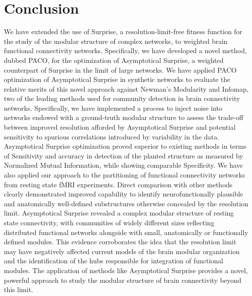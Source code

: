 \section{Conclusion}
We have extended the use of Surprise, a resolution-limit-free fitness function for the study of the modular structure of complex networks, to weighted brain functional connectivity networks. Specifically, we have developed a novel method, dubbed PACO, for the optimization of Asymptotical Surprise, a weighted counterpart of Surprise in the limit of large networks. We have applied PACO optimization of Asymptotical Surprise in synthetic networks to evaluate the relative merits of this novel approach against Newman's Modularity and Infomap, two of the leading methods used for community detection in brain connectivity networks. Specifically, we have implemented a process to inject noise into networks endowed with a ground-truth modular structure to assess the trade-off between improved resolution afforded by Asymptotical Surprise and potential sensitivity to spurious correlations introduced by variability in the data. Asymptotical Surprise optimization proved superior to existing methods in terms of Sensitivity and accuracy in detection of the planted structure as measured by Normalized Mutual Information, while showing comparable Specificity. We have also applied our approach to the partitioning of functional connectivity networks from resting state fMRI experiments. Direct comparison with other methods clearly demonstrated improved capability to identify neurofunctionally plausible and anatomically well-defined substructures otherwise concealed by the resolution limit. Asymptotical Surprise revealed a complex modular structure of resting state connectivity, with communities of widely different sizes reflecting distributed functional networks alongside with small, anatomically or functionally defined modules. This evidence corroborates the idea that the resolution limit may have negatively affected current models of the brain modular organization and the identification of the hubs responsible for integration of functional modules. 
The application of methods like Asymptotical Surprise provides a novel, powerful approach to study the modular structure of brain connectivity beyond this limit.

